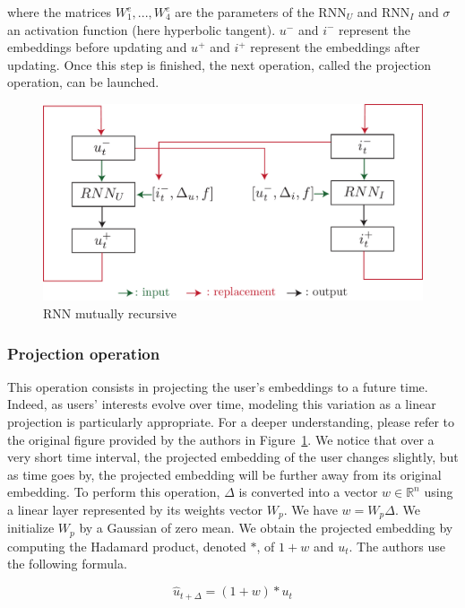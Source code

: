 where the matrices $W_1^e, ..., W_4^e$ are the parameters of the RNN$_U$ and RNN$_I$ and $\sigma$ an activation function (here hyperbolic tangent). $u^-$ and $i^-$ represent the embeddings before updating and $u^+$ and $i^+$ represent the embeddings after updating. Once this step is finished, the next operation, called the projection operation, can be launched.

\begin{figure}[htbp]
   \centering
    \includegraphics[width=1.0\textwidth]{image/rnn_jodie.pdf}
    \caption{RNN mutually recursive~\cite{kumar2019predicting}}
    \label{recursive RNNs}
\end{figure}

\subsubsection{Projection operation}

This operation consists in projecting the user's embeddings to a future time. Indeed, as users' interests evolve over time, modeling this variation as a linear projection is particularly appropriate. For a deeper understanding, please refer to the original figure provided by the authors in Figure~\ref{recursive RNNs}. We notice that over a very short time interval, the projected embedding of the user changes slightly, but as time goes by, the projected embedding will be further away from its original embedding. To perform this operation, $\Delta$ is converted into a vector $w \in \mathbb{R}^n$ using a linear layer represented by its weights vector $W_p$. We have $w = W_p \Delta$.  We initialize $W_p$ by a Gaussian of zero mean. We obtain the projected embedding by computing the Hadamard product, denoted $*$, of $1+w$ and $u_t$. The authors use the following formula.

$$
\widehat u_{t+\Delta} = (1+w) * u_t
$$

